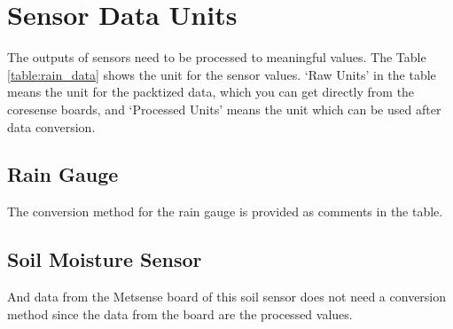 \section{Sensor Data Units}\label{section:parameterUnits}

The outputs of sensors need to be processed to meaningful values.
The Table \ref{table:rain_data} shows the unit for the sensor values.
`Raw Units' in the table means the unit for the packtized data, which you can get directly from the coresense boards, and `Processed Units' means the unit which can be used after data conversion.


\subsection{Rain Gauge}
The conversion method for the rain gauge is provided as comments in the table.\\


\begin{table}[H]
    \caption{Sub-packet data for sensors}
    \label{table:rain_data}
\end{table}


\subsection{Soil Moisture Sensor}
And data from the Metsense board of this soil sensor does not need a conversion method since the data from the board are the processed values.


\begin{table}[H]
    \caption{Sub-packet for rain gauge}
    \label{table:soil_data}
\end{table}

